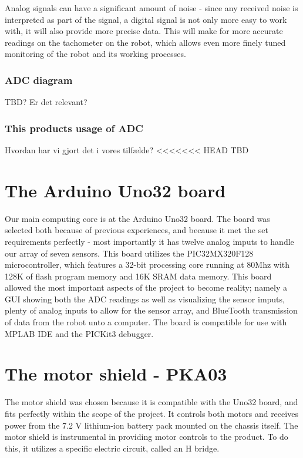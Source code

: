Analog signals can have a significant amount of noise - since any received noise is interpreted as part of the signal, a digital signal is not only more easy to work with, it will also provide more precise data. This will make for more accurate readings on the tachometer on the robot, which allows even more finely tuned monitoring of the robot and its working processes. \\

\subsubsection{ADC diagram} 
TBD? Er det relevant?

\subsubsection{This products usage of ADC}
Hvordan har vi gjort det i vores tilfælde?
<<<<<<< HEAD
TBD

\section{The Arduino Uno32 board}

Our main computing core is at the Arduino Uno32 board. The board was selected both because of previous experiences, and because it met the set requirements perfectly - most importantly it has twelve analog imputs to handle our array of seven sensors. This board utilizes the PIC32MX320F128 microcontroller, which features a 32-bit processing core running at 80Mhz with 128K of flash program memory and 16K SRAM data memory. This board allowed the most important aspects of the project to become reality; namely a GUI showing both the ADC readings as well as visualizing the sensor imputs, plenty of analog inputs to allow for the sensor array, and BlueTooth transmission of data from the robot unto a computer.\newline
The board is compatible for use with MPLAB IDE and the PICKit3 debugger.

\section{The motor shield - PKA03}

The motor shield was chosen because it is compatible with the Uno32 board, and fits perfectly within the scope of the project. It controls both motors and receives power from the 7.2 V lithium-ion battery pack mounted on the chassis itself. The motor shield is instrumental in providing motor controls to the product. To do this, it utilizes a specific electric circuit, called an H bridge.

